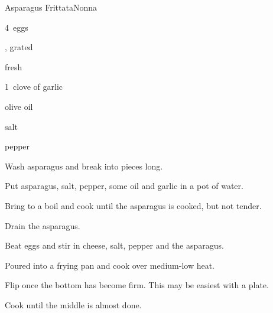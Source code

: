 \begin{recipe}{Asparagus Frittata}{Nonna}{}

\begin{ingredients}
\item 4~eggs
\item {}, grated
\item \C{1 \half} fresh 
\item 1~clove of garlic
\item olive oil
\item salt
\item pepper
\end{ingredients}

\begin{directions}
\item Wash asparagus and break into pieces  long.
\item Put asparagus, salt, pepper, some oil and garlic in a pot of water.
\item Bring to a boil and cook until the asparagus is cooked, but not tender.
\item Drain the asparagus.
\item Beat eggs and stir in cheese, salt, pepper and the asparagus.
\item Poured into a frying pan and cook over medium-low heat.
\item Flip once the bottom has become firm. This may be easiest with a plate.
\item Cook until the middle is almost done.
\end{directions}

\end{recipe}
